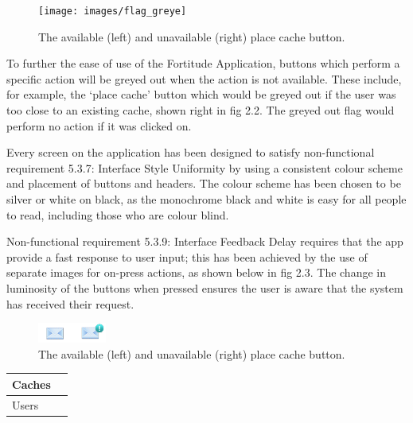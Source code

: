 \begin{figure}
	\vspace{-20pt}
	\begin{center}
	\texttt{[image: images/flag\_greye]}
	\caption{The available (left) and unavailable (right) place cache button.}
	\end{center}
	\vspace{-10pt}
\end{figure}

To further the ease of use of the Fortitude Application, buttons which perform a specific action will be greyed out when the action is not available. These include, for example, the ‘place cache’ button which would be greyed out if the user was too close to an existing cache, shown right in fig 2.2. The greyed out flag would perform no action if it was clicked on.

Every screen on the application has been designed to satisfy non-functional requirement 5.3.7: Interface Style Uniformity by using a consistent colour scheme and placement of buttons and headers. The colour scheme has been chosen to be silver or white on black, as the monochrome black and white is easy for all people to read, including those who are colour blind.

Non-functional requirement 5.3.9: Interface Feedback Delay requires that the app provide a fast response to user input; this has been achieved by the use of separate images for on-press actions, as shown below in fig 2.3. The change in luminosity of the buttons when pressed ensures the user is aware that the system has received their request.

\begin{figure}[p]
	\vspace{-20pt}
	\begin{center}
	\includegraphics[width=0.2\textwidth]{images/news_icons}
	\caption{The available (left) and unavailable (right) place cache button.}
	\end{center}
	\vspace{-10pt}
\end{figure}









\begin{tabular}{| p{} | p{} |}
	\hline
	Caches &
	\lipsum[1] \\
	\hline
	Users &
	\lipsum[2] \\
	\hline
\end{tabular}
